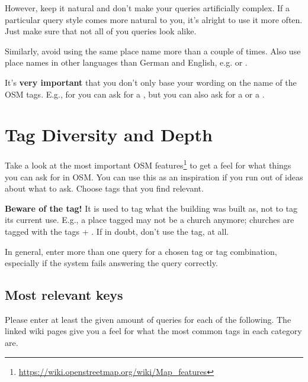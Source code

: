 However, keep it natural and don’t make your queries artificially complex. If a
particular query style comes more natural to you, it’s alright to use it more
often. Just make sure that not all of you queries look alike.

Similarly, avoid using the same place name more than a couple of times. Also use
place names in other languages than German and English, e.g.  or .

It’s \textbf{very important} that you don’t only base your wording on the name
of the OSM tags. E.g., for  you can ask for a
, but you can also ask for a  or a .

\section{Tag Diversity and Depth}

Take a  look at the most important OSM
features\footnote{\url{https://wiki.openstreetmap.org/wiki/Map_features}} to get
a feel for what things you can ask for in OSM. You can use this as an
inspiration if you run out of ideas about what to ask. Choose tags that you find
relevant.

\textbf{Beware of the  tag!} It is used to tag what the
building was built as, not to tag its current use. E.g., a place tagged
 may not be a church anymore; churches are tagged with
the tags  + . If
in doubt, don’t use the  tag, at all.

In general, enter more than one query for a chosen tag or tag combination,
especially if the system fails answering the query correctly.

\subsection{Most relevant keys}

Please enter at least the given amount of queries for each of the following. The
linked wiki pages give you a feel for what the most common tags in each category
are.

